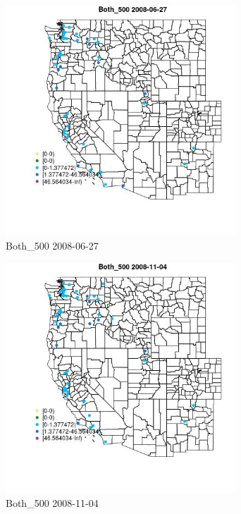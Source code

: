 \begin{figure} 
\centering  
\includegraphics[width=0.77\textwidth]{Code_Outputs/Report_ML_input_PM25_Step4_part_e_de_duplicated_aves_MapObsBoth_5002008-06-27.jpg} 
\caption{\label{fig:Report_ML_input_PM25_Step4_part_e_de_duplicated_avesMapObsBoth_5002008-06-27}Both_500 2008-06-27} 
\end{figure} 
 

\begin{figure} 
\centering  
\includegraphics[width=0.77\textwidth]{Code_Outputs/Report_ML_input_PM25_Step4_part_e_de_duplicated_aves_MapObsBoth_5002008-11-04.jpg} 
\caption{\label{fig:Report_ML_input_PM25_Step4_part_e_de_duplicated_avesMapObsBoth_5002008-11-04}Both_500 2008-11-04} 
\end{figure} 
 

